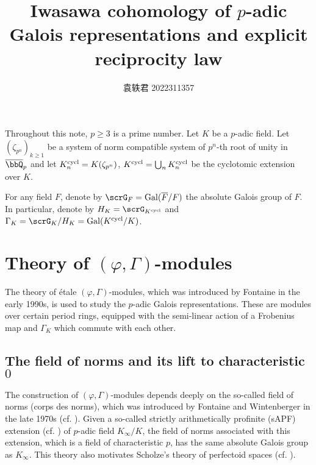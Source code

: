 \documentclass[a4paper,oneside]{amsart}
\title{Iwasawa cohomology of $p$-adic Galois representations and explicit reciprocity law}
\author{袁轶君\textsuperscript{\orcidlink{0000-0001-6571-6980}} 2022311357}
\numberwithin{equation}{section}
\numberwithin{figure}{section}
\begin{document}
\maketitle
\tableofcontents
Throughout this note, $p\geq 3$ is a prime number. Let $K$ be a $p$-adic field. Let $(\zeta_{p^n})_{k\geq 1}$ be a system of norm compatible system of $p^n$-th root of unity in $\overline{\bbQ}_p$ and let $K_n^{\operatorname{cycl}}=K(\zeta_{p^n})$, $K^{\operatorname{cycl}}=\bigcup_n K_n^{\operatorname{cycl}}$ be the cyclotomic extension over $K$.

For any field $F$, denote by $\scrG_F=\opn{Gal}(\overline{F}/F)$ the absolute Galois group of $F$. In particular, denote by $H_K=\scrG_{K^{\opn{cycl}}}$ and $\Gamma_K=\scrG_K/H_K=\opn{Gal}(K^{\opn{cycl}}/K)$.
\section{Theory of $(\varphi,\Gamma)$-modules}
The theory of \'etale $(\varphi,\Gamma)$-modules, which was introduced by Fontaine in the early 1990s, is used to study the $p$-adic Galois representations. These are modules over certain period rings, equipped with the semi-linear action of a Frobenius map and $\Gamma_K$ which commute with each other.

\subsection{The field of norms and its lift to characteristic $0$}
The construction of $(\varphi,\Gamma)$-modules depends deeply on the so-called field of norms (corps des norms), which was introduced by Fontaine and Wintenberger in the late 1970s (cf. \cite{fontaine_extensions_1979,fontaine_corps_1979,wintenberger_corps_1983}). Given a so-called strictly arithmetically profinite (sAPF) extension (cf. \cite[D\'efinitions 1.2.1]{wintenberger_corps_1983}) of $p$-adic field $K_\infty/K$, the field of norms associated with this extension, which is a field of characteristic $p$, has the same absolute Galois group as $K_\infty$. This theory also motivates Scholze's theory of perfectoid spaces (cf. \cite[Theorem 1.1]{scholze_perfectoid_2012}).
\end{document}
